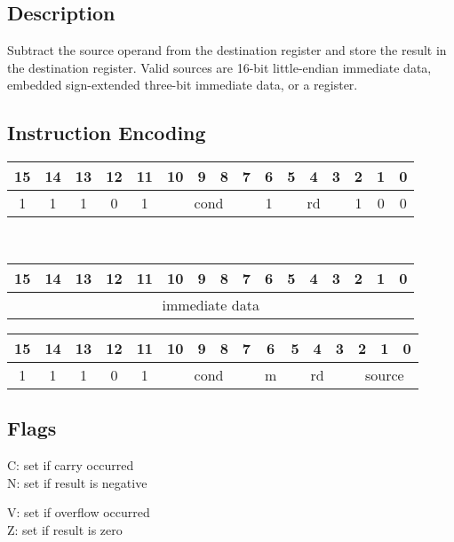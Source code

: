 \documentclass[11pt]{book}
\newcommand*{\encoding}[1]{\noindent
\begin{tabular}{|c|c|c|c|c|c|c|c|c|c|c|c|c|c|c|c|}
\multicolumn{1}{c}{15}&
\multicolumn{1}{c}{14}&
\multicolumn{1}{c}{13}&
\multicolumn{1}{c}{12}&
\multicolumn{1}{c}{11}&
\multicolumn{1}{c}{10}&
\multicolumn{1}{c}{9}&
\multicolumn{1}{c}{8}&
\multicolumn{1}{c}{7}&
\multicolumn{1}{c}{6}&
\multicolumn{1}{c}{5}&
\multicolumn{1}{c}{4}&
\multicolumn{1}{c}{3}&
\multicolumn{1}{c}{2}&
\multicolumn{1}{c}{1}&
\multicolumn{1}{c}{0}\\\hline
#1\\\hline
\end{tabular}}
\begin{document}
\subsection*{Description}
Subtract the source operand from the destination register
and store the result in the destination register.
Valid sources are 16-bit little-endian immediate data,
embedded sign-extended three-bit immediate data,
or a register.

\subsection*{Instruction Encoding}
\encoding{1&1&1&0&1%
&\multicolumn{4}{|c|}{cond}%
&1&\multicolumn{3}{|c|}{rd}&1&0&0}\\\null\qquad
\encoding{\multicolumn{16}{|c|}{immediate data}}

\vspace{2\baselineskip}
\encoding{1&1&1&0&1%
&\multicolumn{4}{|c|}{cond}%
&m&\multicolumn{3}{|c|}{rd}&\multicolumn{3}{|c|}{source}}

\subsection*{Flags}
\begin{multicols}{2}\noindent
  C: set if carry occurred\\
  N: set if result is negative

  \columnbreak\noindent
  V: set if overflow occurred\\
  Z: set if result is zero
\end{multicols}
\end{document}
